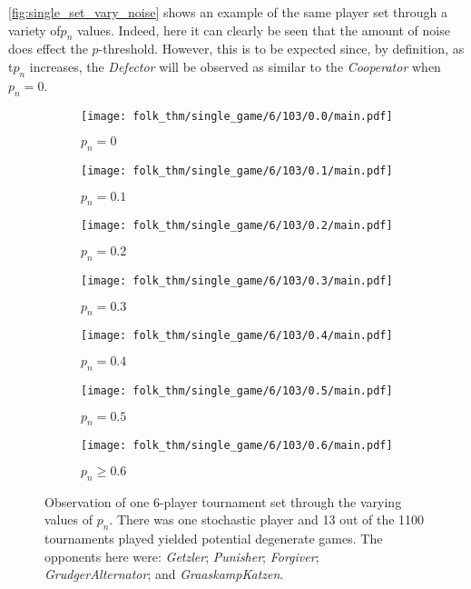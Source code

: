 \autoref{fig:single_set_vary_noise} shows an example of the same player set
through a variety of\(p_{n}\) values. Indeed, here it can clearly be seen that
the amount of
noise does effect the \(p\)-threshold. However, this is to be expected since, by
definition, as t\(p_{n}\) increases, the \textit{Defector} will be observed
as similar to the \textit{Cooperator} when \(p_{n}=0\).

\begin{figure}
    \begin{subfigure}{0.3\textwidth}
        \centering
        \texttt{[image: folk\_thm/single\_game/6/103/0.0/main.pdf]}
        \caption{\(p_{n}=0\)}
    \end{subfigure}
    \begin{subfigure}{0.3\textwidth}
        \centering
        \texttt{[image: folk\_thm/single\_game/6/103/0.1/main.pdf]}
        \caption{\(p_{n}=0.1\)}
    \end{subfigure}
    \begin{subfigure}{0.3\textwidth}
        \centering
        \texttt{[image: folk\_thm/single\_game/6/103/0.2/main.pdf]}
        \caption{\(p_{n}=0.2\)}
    \end{subfigure}

    \begin{subfigure}{0.2\textwidth}
        \centering
        \texttt{[image: folk\_thm/single\_game/6/103/0.3/main.pdf]}
        \caption{\(p_{n}=0.3\)}
    \end{subfigure}
    \begin{subfigure}{0.2\textwidth}
        \centering
        \texttt{[image: folk\_thm/single\_game/6/103/0.4/main.pdf]}
        \caption{\(p_{n}=0.4\)}
    \end{subfigure}
    \begin{subfigure}{0.2\textwidth}
        \centering
        \texttt{[image: folk\_thm/single\_game/6/103/0.5/main.pdf]}
        \caption{\(p_{n}=0.5\)}
    \end{subfigure}
    \begin{subfigure}{0.2\textwidth}
        \centering
        \texttt{[image: folk\_thm/single\_game/6/103/0.6/main.pdf]}
        \caption{\(p_{n} \ge 0.6\)}
    \end{subfigure}
    \caption{Observation of one 6-player tournament set through the varying
    values of \(p_{n}\). There was one stochastic player and 13 out of
    the 1100 tournaments played yielded potential degenerate games. The opponents here were: \textit{Getzler};
    \textit{Punisher}; \textit{Forgiver}; \textit{GrudgerAlternator}; and \textit{GraaskampKatzen}.}\label{fig:single_set_vary_noise}
\end{figure}


